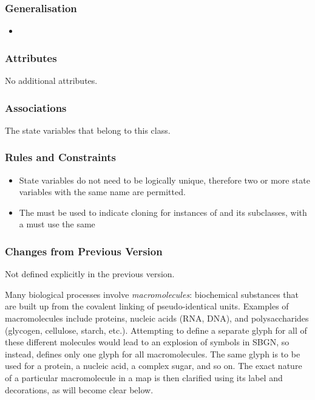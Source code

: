 \subsubsection{Generalisation}

\begin{itemize}
\item {}
\end{itemize}

\subsubsection{Attributes}

No additional attributes.

\subsubsection{Associations}

\begin{attributes}
 The state variables
  that belong to this class.
\end{attributes}

\subsubsection{Rules and Constraints}

\begin{itemize}
\item State variables do not need to be logically unique, therefore
  two or more state variables with the same name are permitted.
\item The  must be used to indicate
  cloning for instances of  and its subclasses,
  with a must use the same
\end{itemize}

\subsubsection{Changes from Previous Version}

Not defined explicitly in the previous version.

\label{sec:techref:macromolecule}

Many biological processes involve \emph{macromolecules}: biochemical
substances that are built up from the covalent linking of
pseudo-identical units.  Examples of macromolecules include proteins,
nucleic acids (RNA, DNA), and polysaccharides (glycogen, cellulose,
starch, etc.).  Attempting to define a separate glyph for all of these
different molecules would lead to an explosion of symbols in SBGN, so
instead, \SBGNPDLone defines only one glyph for all macromolecules.
The same glyph is to be used for a protein, a nucleic acid, a complex
sugar, and so on.  The exact nature of a particular macromolecule in a
map is then clarified using its label and decorations, as will become
clear below.


